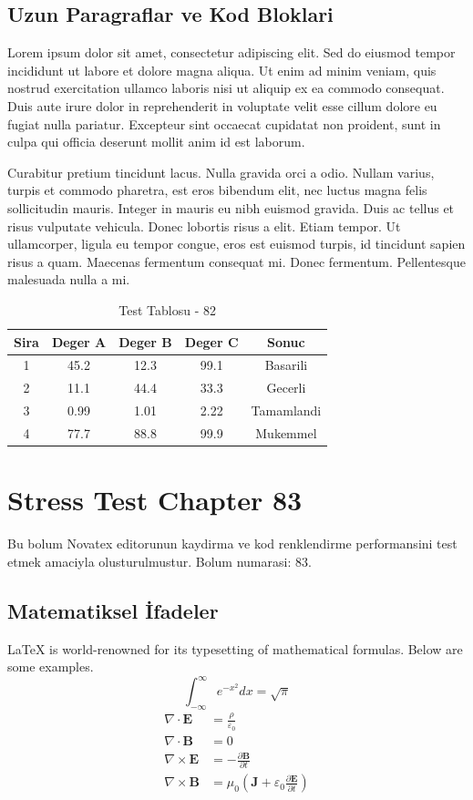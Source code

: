 \documentclass[12pt,a4paper]{article}
\begin{document}
\subsection{Uzun Paragraflar ve Kod Bloklari}
Lorem ipsum dolor sit amet, consectetur adipiscing elit. Sed do eiusmod tempor incididunt ut labore et dolore magna aliqua. Ut enim ad minim veniam, quis nostrud exercitation ullamco laboris nisi ut aliquip ex ea commodo consequat. Duis aute irure dolor in reprehenderit in voluptate velit esse cillum dolore eu fugiat nulla pariatur. Excepteur sint occaecat cupidatat non proident, sunt in culpa qui officia deserunt mollit anim id est laborum.

Curabitur pretium tincidunt lacus. Nulla gravida orci a odio. Nullam varius, turpis et commodo pharetra, est eros bibendum elit, nec luctus magna felis sollicitudin mauris. Integer in mauris eu nibh euismod gravida. Duis ac tellus et risus vulputate vehicula. Donec lobortis risus a elit. Etiam tempor. Ut ullamcorper, ligula eu tempor congue, eros est euismod turpis, id tincidunt sapien risus a quam. Maecenas fermentum consequat mi. Donec fermentum. Pellentesque malesuada nulla a mi.

\begin{table}[h!]
\centering
\begin{tabular}{|c|c|c|c|c|}
\hline
\textbf{Sira} & \textbf{Deger A} & \textbf{Deger B} & \textbf{Deger C} & \textbf{Sonuc} \\
\hline
1 & 45.2 & 12.3 & 99.1 & Basarili \\
2 & 11.1 & 44.4 & 33.3 & Gecerli \\
3 & 0.99 & 1.01 & 2.22 & Tamamlandi \\
4 & 77.7 & 88.8 & 99.9 & Mukemmel \\
\hline
\end{tabular}
\caption{Test Tablosu - 82}
\end{table}

\newpage
\section{Stress Test Chapter 83}
Bu bolum Novatex editorunun kaydirma ve kod renklendirme performansini test etmek amaciyla olusturulmustur. Bolum numarasi: 83.

\subsection{Matematiksel İfadeler}
\LaTeX{} is world-renowned for its typesetting of mathematical formulas. Below are some examples.
\begin{equation}
\int_{-\infty}^{\infty} e^{-x^2} dx = \sqrt{\pi}
\end{equation}
\begin{align}
\nabla \cdot \mathbf{E} &= \frac{\rho}{\varepsilon_0} \\
\nabla \cdot \mathbf{B} &= 0 \\
\nabla \times \mathbf{E} &= -\frac{\partial \mathbf{B}}{\partial t} \\
\nabla \times \mathbf{B} &= \mu_0\left(\mathbf{J} + \varepsilon_0 \frac{\partial \mathbf{E}}{\partial t}\right)
\end{align}
\end{document}
